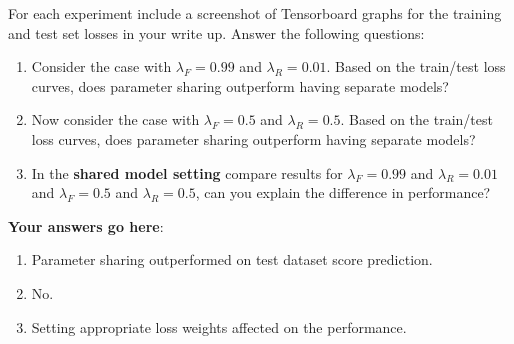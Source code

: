\documentclass[12pt]{article}
\begin{document}
    For each experiment include a screenshot of Tensorboard graphs for the training and test set losses in your write up. Answer the following questions:

    \begin{enumerate}
        \item Consider the case with $\lambda_F=0.99$ and $\lambda_R=0.01$. Based on the train/test loss curves, does parameter sharing outperform having separate models?

        \item Now consider the case with $\lambda_F=0.5$ and $\lambda_R=0.5$. Based on the train/test loss curves, does parameter sharing outperform having separate models?

        \item In the \textbf{shared model setting} compare results for $\lambda_F=0.99$ and $\lambda_R=0.01$ and $\lambda_F=0.5$ and $\lambda_R=0.5$, can you explain the difference in performance?
    \end{enumerate}

    \noindent\textbf{Your answers go here}:
    \begin{enumerate}
        \item Parameter sharing outperformed on test dataset score prediction.
        \item No.
        \item Setting appropriate loss weights affected on the performance.
    \end{enumerate}


    \newpage
    
    
\end{document}
